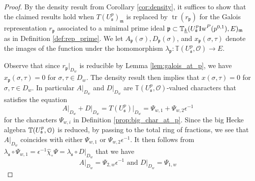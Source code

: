 \documentclass[leqno]{amsart}
\theoremstyle{definition}
\theoremstyle{remark}
\newcommand{\oo}{\mathcal{O}}
\newcommand{\eo}{\EuScript{O}}
\DeclareMathOperator{\mtr}{tr}
\newcommand{\fm}{\mathfrak{m}}
\newcommand{\fp}{\mathfrak{p}}
\newcommand{\fs}{\mathfrak{s}}
\newcommand{\wt}[1]{\underline{ #1 }}
\newcommand{\Iw}{\textnormal{Iw}} %
\newcommand{\TT}{\mathbb{T}} %
\begin{document}
\begin{proof}

By the density result from Corollary \ref{cor:density},
it suffices to show that
the claimed results hold
when $T(U^p_\fs)_\fm$
is replaced by $\mtr(r_\fp)$ 
for the Galois representation $r_\fp$
associated to a minimal prime ideal
$\fp\subset \TT_{\wt{k}}(U^p_\fs\Iw^P(p^{0,1}),E)_\fm$
as in Definition \eqref{def:rep_prime}.
We let $A_\fp(\sigma), D_\fp(\sigma)$, and $x_\fp(\sigma,\tau)$
denote the images of the function
under the homomorphism $\lambda_\fp\colon \TT(U^p_\fs,\oo)\to E$.

Observe that since $r_\fp\vert_{D_w}$
is reducible by Lemma \ref{lem:galois_at_p},
we have $x_\fp(\sigma,\tau)=0$
for $\sigma,\tau\in D_w$.
The density result then implies that
$x(\sigma,\tau)=0$
for $\sigma,\tau\in D_w$.
In particular 
$A\vert_{D_w}$ and
$D\vert_{D_w}$ are 
$\TT(U^p_\fs,\oo)$-valued characters that satisfies the equation
\[
    A\vert_{D_w}+D\vert_{D_w}=T(U^p_\fs)\vert_{D_w}=
    \Psi_{w,1}+\Psi_{w,2}\epsilon^{-1}
\]
for the characters $\Psi_{w,i}$
in Definition \ref{prop:big_char_at_p}.
Since the big Hecke algebra $\TT(U^p_\fs,\eo)$ is reduced,
by passing to the total ring of fractions,
we see that $A\vert_{D_w}$ coincides with 
either $\Psi_{w,1}$ or $\Psi_{w,2}\epsilon^{-1}$.
It then follows from 
$ \lambda_\fs\circ \Psi_{w,1}=
\epsilon^{-1}\hat{\chi}_\circ\Psi=
\lambda_\fs\circ D\vert_{D_w}$ that we have
\begin{equation}\label{eq:id_char}
    A\vert_{D_w}=\Psi_{2,w}\epsilon^{-1} \text{ and }
    D\vert_{D_w}=\Psi_{1,w}
\end{equation}


\end{proof}
\end{document}
